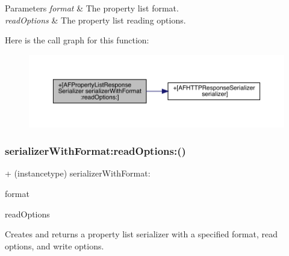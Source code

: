 \begin{DoxyParams}{Parameters}
{\em format} & The property list format. \\
\hline
{\em read\+Options} & The property list reading options. \\
\hline
\end{DoxyParams}
Here is the call graph for this function\+:\nopagebreak
\begin{figure}[H]
\begin{center}
\leavevmode
\includegraphics[width=350pt]{interface_a_f_property_list_response_serializer_a8998ba88f9bdae98d24a0e113ff6bbcf_cgraph}
\end{center}
\end{figure}
\mbox{\label{interface_a_f_property_list_response_serializer_a8998ba88f9bdae98d24a0e113ff6bbcf}} 
\subsubsection{\texorpdfstring{serializer\+With\+Format\+:read\+Options\+:()}{serializerWithFormat:readOptions:()}\hspace{0.1cm}{\footnotesize\ttfamily [3/3]}}
{\footnotesize\ttfamily + (instancetype) serializer\+With\+Format\+: \begin{DoxyParamCaption}\item[{(N\+S\+Property\+List\+Format)}]{format }\item[{readOptions:(N\+S\+Property\+List\+Read\+Options)}]{read\+Options }\end{DoxyParamCaption}}

Creates and returns a property list serializer with a specified format, read options, and write options.


